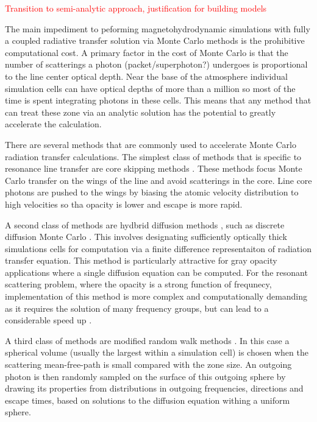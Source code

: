 \documentclass{aastex63}
\newcommand{\todo}[1]{\textcolor{red}{#1}}
\begin{document}
\todo{Transition to semi-analytic approach, justification for building models}

The main impediment to peforming magnetohydrodynamic simulations with fully a coupled radiative transfer solution via Monte Carlo methods is the prohibitive computational cost. A primary factor in the cost of Monte Carlo is that the number of scatterings a photon (packet/superphoton?) undergoes is proportional to the line center optical depth.  Near the base of the atmosphere individual simulation cells can have optical depths of more than a million so most of the time is spent integrating photons in these cells. This means that any method that can treat these zone via an analytic solution has the potential to greatly accelerate the calculation.

There are several methods that are commonly used to accelerate Monte Carlo radiation transfer calculations.  The simplest class of methods that is specific to resonance line transfer are core skipping methods \citep{1968ApJ...153..783A,2002ApJ...567..922A}.  These methods focus Monte Carlo transfer on the wings of the line and avoid scatterings in the core. Line core photons are pushed to the wings by biasing the atomic velocity distribution to high velocities so tha opacity is lower and escape is more rapid.

A second class of methods are hydbrid diffusion methods \citep{2001JCoPh.172..543G}, such as discrete diffusion Monte Carlo \citep{2007JCoPh.222..485D}. This involves designating sufficiently optically thick simulations cells for computation via a finite difference representaiton of radiation transfer equation. This method is particularly attractive for gray opacity applications where a single diffusion equation can be computed.  For the resonant scattering problem, where the opacity is a strong function of frequnecy, implementation of this method is more complex and computationally demanding as it requires the solution of many frequency groups, but can lead to a considerable speed up \citep{2018MNRAS.479.2065S}.

A third class of methods are modified random walk methods \citep{1984JCoPh..54..508F,2009A&A...497..155M,Robitaille2010}. In this case a spherical volume (usually the largest within a simulation cell) is chosen when the scattering mean-free-path is small compared with the zone size.  An outgoing photon is then randomly sampled on the surface of this outgoing sphere by drawing its properties from distributions in outgoing frequencies, directions and escape times, based on solutions to the diffusion equation withing a uniform sphere. 
\end{document}
